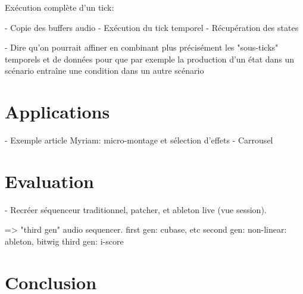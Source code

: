 \documentclass[a4paper]{article}
\begin{document}
Exécution complète d'un tick: 

- Copie des buffers audio
- Exécution du tick temporel
- Récupération des states

- Dire qu'on pourrait affiner en combinant plus précisément les "sous-ticks" temporels et de données
pour que par exemple la production d'un état dans un scénario entraîne une condition dans un autre scénario


\section{Applications}
- Exemple article Myriam: micro-montage et sélection d'effets
- Carrousel
\section{Evaluation}
- Recréer séquenceur traditionnel, patcher, et ableton live (vue session).

=> "third gen" audio sequencer.
first gen: cubase, etc
second gen: non-linear: ableton, bitwig
third gen: i-score

\section{Conclusion}
\end{document}
